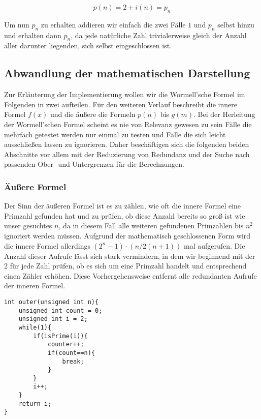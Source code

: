 \documentclass[11pt]{scrartcl}
\begin{document}
\begin{equation}
p(n) = 2 + i(n) = p_n
\label{Wormell Teilformel 5}
\end{equation}

Um nun $p_n$ zu erhalten addieren wir einfach die zwei Fälle $1$ und $p_n$ selbst hinzu und erhalten dann $p_n$, da jede natürliche Zahl trivialerweise gleich der Anzahl aller darunter liegenden, sich selbst eingeschlossen ist.

\subsection{Abwandlung der mathematischen Darstellung}
Zur Erläuterung der Implementierung wollen wir die Wormell'sche Formel im Folgenden in zwei aufteilen. Für den weiteren Verlauf beschreibt die innere Formel $f(x)$ und die äußere die Formeln $p(n)$ bis $g(m)$. Bei der Herleitung der Wormell'schen Formel scheint es nie von Relevanz gewesen zu sein Fälle die mehrfach getestet werden nur einmal zu testen und Fälle die sich leicht ausschließen lassen zu ignorieren. Daher beschäftigen sich die folgenden beiden Abschnitte vor allem mit der Reduzierung von Redundanz und der Suche nach passenden Ober- und Untergrenzen für die Berechnungen.

\subsubsection{Äußere Formel}
\label{Aussere Formel}
Der Sinn der äußeren Formel ist es zu zählen, wie oft die innere Formel eine Primzahl gefunden hat und zu prüfen, ob diese Anzahl bereits so groß ist wie unser gesuchtes $n$, da in diesem Fall alle weiteren gefundenen Primzahlen bis $n^2$ ignoriert werden müssen. Aufgrund der mathematisch geschlossenen Form wird die innere Formel allerdings $(2^n-1)\cdot(n/2(n+1))$ mal aufgerufen. Die Anzahl dieser Aufrufe lässt sich stark vermindern, in dem wir beginnend mit der 2 für jede Zahl prüfen, ob es sich um eine Primzahl handelt und entsprechend einen Zähler erhöhen. Diese Vorhergehensweise entfernt alle redundanten Aufrufe der inneren Formel.

\begin{lstlisting}[frame=single, captionpos=b, label=code-comm-task, xleftmargin=.03\textwidth]
int outer(unsigned int n){
    unsigned int count = 0;
    unsigned int i = 2;
    while(1){
        if(isPrime(i)){
            counter++;
            if(count==n){
                break;
            }
        }
        i++;
    }
    return i;
}
\end{lstlisting}
\end{document}
